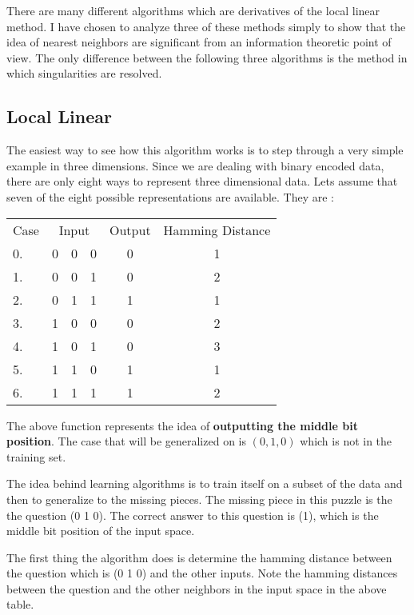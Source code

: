 	There are many different algorithms which are derivatives of
the local linear method.  I have chosen to analyze three of these
methods simply to show that the idea of nearest neighbors are
significant from an information theoretic point of view.  The only
difference between the following three algorithms is the method in
which singularities are resolved.

\subsection{Local Linear}

	The easiest way to see how this algorithm works is to step
through a very simple example in three dimensions.  Since we are
dealing with binary encoded data, there are only eight ways to
represent three dimensional data.  Lets assume that seven of the eight
possible representations are available.  They are :

\begin{center}
\begin{tabular}{llllcc}
\multicolumn{1}{c}{Case} &
\multicolumn{3}{c}{Input} &
\multicolumn{1}{c}{Output} &
\multicolumn{1}{c}{Hamming Distance} \\
0. & 0 & 0 & 0 & 0 & 1 \\
1. & 0 & 0 & 1 & 0 & 2 \\
2. & 0 & 1 & 1 & 1 & 1 \\
3. & 1 & 0 & 0 & 0 & 2 \\
4. & 1 & 0 & 1 & 0 & 3 \\
5. & 1 & 1 & 0 & 1 & 1 \\
6. & 1 & 1 & 1 & 1 & 2 
\end{tabular}
\end{center}

	The above function represents the idea of {\bf outputting the
middle bit position}.  The case that will be generalized on is $(0, 1,
0)$ which is not in the training set.
	
	The idea behind learning algorithms is to train itself on a
subset of the data and then to generalize to the missing pieces.  The
missing piece in this puzzle is the the question (0 1 0). The correct
answer to this question is (1), which is the middle bit position of
the input space.

	The first thing the algorithm does is determine the hamming
distance between the question which is (0 1 0) and the other inputs.
Note the hamming distances between the question and the other
neighbors in the input space in the above table.

